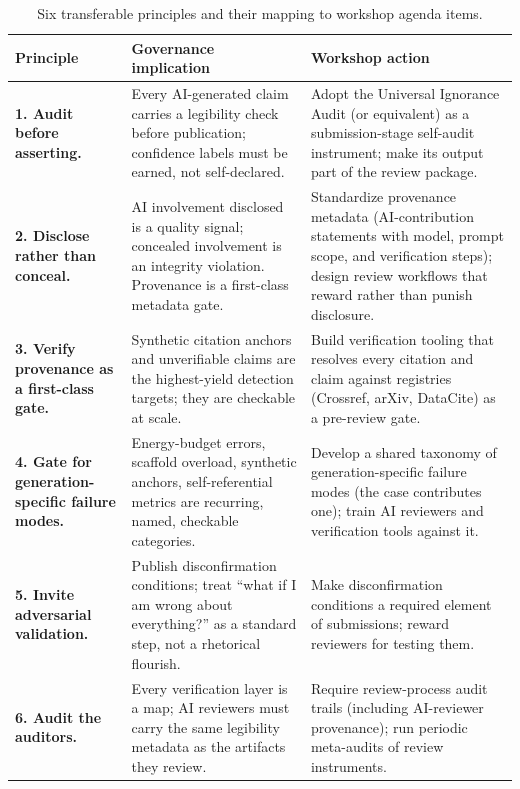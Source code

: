 \documentclass{article}
\begin{document}
\begin{table}[h]
\centering
\small
\begin{tabular}{p{3.1cm}p{4.4cm}p{6.2cm}}
\toprule
\textbf{Principle} & \textbf{Governance implication} & \textbf{Workshop action} \\
\midrule
\textbf{1. Audit before asserting.} & Every AI-generated claim carries a legibility check before publication; confidence labels must be earned, not self-declared. & Adopt the Universal Ignorance Audit (or equivalent) as a submission-stage self-audit instrument; make its output part of the review package. \\
\textbf{2. Disclose rather than conceal.} & AI involvement disclosed is a quality signal; concealed involvement is an integrity violation. Provenance is a first-class metadata gate. & Standardize provenance metadata (AI-contribution statements with model, prompt scope, and verification steps); design review workflows that reward rather than punish disclosure. \\
\textbf{3. Verify provenance as a first-class gate.} & Synthetic citation anchors and unverifiable claims are the highest-yield detection targets; they are checkable at scale. & Build verification tooling that resolves every citation and claim against registries (Crossref, arXiv, DataCite) as a pre-review gate. \\
\textbf{4. Gate for generation-specific failure modes.} & Energy-budget errors, scaffold overload, synthetic anchors, self-referential metrics are recurring, named, checkable categories. & Develop a shared taxonomy of generation-specific failure modes (the case contributes one); train AI reviewers and verification tools against it. \\
\textbf{5. Invite adversarial validation.} & Publish disconfirmation conditions; treat ``what if I am wrong about everything?'' as a standard step, not a rhetorical flourish. & Make disconfirmation conditions a required element of submissions; reward reviewers for testing them. \\
\textbf{6. Audit the auditors.} & Every verification layer is a map; AI reviewers must carry the same legibility metadata as the artifacts they review. & Require review-process audit trails (including AI-reviewer provenance); run periodic meta-audits of review instruments. \\
\bottomrule
\end{tabular}
\caption{Six transferable principles and their mapping to workshop agenda items.}
\label{tab:principles}
\end{table}
\end{document}
